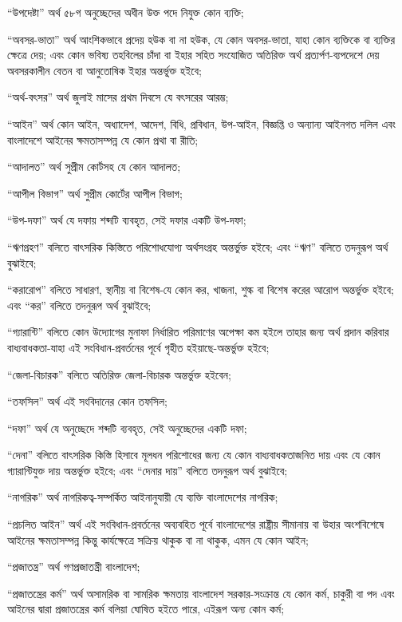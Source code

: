 \documentclass[11pt]{article}
\begin{document}
“উপদেষ্টা” অর্থ ৫৮গ অনুচ্ছেদের অধীন উক্ত পদে নিযুক্ত কোন ব্যক্তি;

“অবসর-ভাতা” অর্থ আংশিকভাবে প্রদেয় হউক বা না হউক, যে কোন অবসর-ভাতা, যাহা
কোন ব্যক্তিকে বা ব্যক্তির ক্ষেত্রে দেয়; এবং কোন ভবিষ্য তহবিলের চাঁদা বা ইহার
সহিত সংযোজিত অতিরিক্ত অর্থ প্রত্যর্পণ-ব্যপদেশে দেয় অবসরকালীন বেতন বা আনুতোষিক
ইহার অন্তর্ভূ্ক্ত হইবে;

“অর্থ-বৎসর” অর্থ জুলাই মাসের প্রথম দিবসে যে বৎসরের আরম্ভ;

“আইন” অর্থ কোন আইন, অধ্যাদেশ, আদেশ, বিধি, প্রবিধান, উপ-আইন, বিজ্ঞপ্তি ও
অন্যান্য আইনগত দলিল এবং বাংলাদেশে আইনের ক্ষমতাসম্পন্ন যে কোন প্রথা বা রীতি;

“আদালত” অর্থ সুপ্রীম কোর্টসহ যে কোন আদালত;

“আপীল বিভাগ” অর্থ সুপ্রীম কোর্টের আপীল বিভাগ;

“উপ-দফা” অর্থ যে দফায় শব্দটি ব্যবহৃত, সেই দফার একটি উপ-দফা;

“ঋণগ্রহণ” বলিতে বাৎসরিক কিস্তিতে পরিশোধযোগ্য অর্থসংগ্রহ অন্তর্ভুক্ত হইবে; এবং
“ঋণ” বলিতে তদনুরূপ অর্থ বুঝাইবে;

“করারোপ” বলিতে সাধারণ, স্থানীয় বা বিশেষ-যে কোন কর, খাজনা, শুল্ক বা বিশেষ
করের আরোপ অন্তর্ভুক্ত হইবে; এবং “কর” বলিতে তদনুরূপ অর্থ বুঝাইবে;

“গ্যারান্টি” বলিতে কোন উদ্যোগের মুনাফা নির্ধারিত পরিমাণের অপেক্ষা কম হইলে
তাহার জন্য অর্থ প্রদান করিবার বাধ্যবাধকতা-যাহা এই সংবিধান-প্রবর্তনের পূর্বে
গৃহীত হইয়াছে-অন্তর্ভুক্ত হইবে;

“জেলা-বিচারক” বলিতে অতিরিক্ত জেলা-বিচারক অন্তর্ভুক্ত হইবেন;

“তফসিল” অর্থ এই সংবিদানের কোন তফসিল;

“দফা” অর্থ যে অনুচ্ছেদে শব্দটি ব্যবহৃত, সেই অনুচ্ছেদের একটি দফা;

“দেনা” বলিতে বাৎসরিক কিস্তি হিসাবে মূলধন পরিশোধের জন্য যে কোন
বাধ্যবাধকতাজনিত দায় এবং যে কোন গ্যারান্টিযুক্ত দায় অন্তর্ভুক্ত হইবে; এবং “দেনার
দায়” বলিতে তদনুরূপ অর্থ বুঝাইবে;

“নাগরিক” অর্থ নাগরিকত্ব-সম্পর্কিত আইনানুযায়ী যে ব্যক্তি বাংলাদেশের নাগরিক;

“প্রচলিত আইন” অর্থ এই সংবিধান-প্রবর্তনের অব্যবহিত পূর্বে বাংলাদেশের রাষ্ট্রীয়
সীমানায় বা উহার অংশবিশেষে আইনের ক্ষমতাসম্পন্ন কিন্তু কার্যক্ষেত্রে সক্রিয় থাকুক
বা না থাকুক, এমন যে কোন আইন;

“প্রজাতন্ত্র” অর্থ গণপ্রজাতন্ত্রী বাংলাদেশ;

“প্রজাতন্ত্রের কর্ম” অর্থ অসামরিক বা সামরিক ক্ষমতায় বাংলাদেশ সরকার-সংক্রান্ত
যে কোন কর্ম, চাকুরী বা পদ এবং আইনের দ্বারা প্রজাতন্ত্রের কর্ম বলিয়া ঘোষিত
হইতে পারে, এইরূপ অন্য কোন কর্ম;
\end{document}
